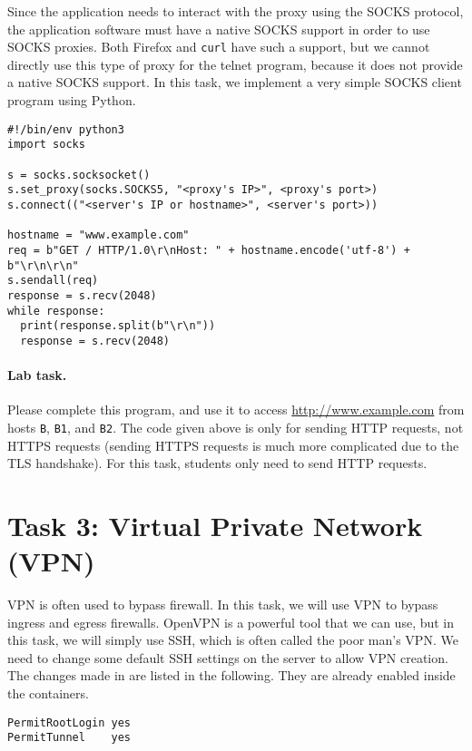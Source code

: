 Since the application needs to interact with the proxy using the
SOCKS protocol, the application software must have a native SOCKS support in order to use
SOCKS proxies. Both Firefox and \texttt{curl} have such a support, but
we cannot directly use this type of proxy for the telnet program,
because it does not provide a native SOCKS support. 
In this task, we implement a very simple SOCKS client program
using Python. 

\begin{lstlisting}
#!/bin/env python3
import socks

s = socks.socksocket()
s.set_proxy(socks.SOCKS5, "<proxy's IP>", <proxy's port>) 
s.connect(("<server's IP or hostname>", <server's port>))                

hostname = "www.example.com"
req = b"GET / HTTP/1.0\r\nHost: " + hostname.encode('utf-8') + b"\r\n\r\n"
s.sendall(req)
response = s.recv(2048)
while response:
  print(response.split(b"\r\n"))
  response = s.recv(2048)
\end{lstlisting}

\paragraph{Lab task.}
Please complete this program, and use it to access \url{http://www.example.com} 
from hosts \texttt{B}, \texttt{B1}, and \texttt{B2}.  
The code given above is only for sending HTTP requests, not HTTPS requests (sending
HTTPS requests is much more complicated due to the TLS handshake). 
For this task, students only need to send HTTP requests.


\section{Task 3: Virtual Private Network (VPN)} 

VPN is often used to bypass firewall. In this task, we will use VPN 
to bypass ingress and egress firewalls.  
OpenVPN is a powerful tool that we can use, but in this task,
we will simply use SSH, which is often called the poor man's VPN. 
We need to change some default SSH settings on the
server to allow VPN creation. The changes made in
 are listed in the following.
They are already enabled inside the containers.

\begin{lstlisting}
PermitRootLogin yes
PermitTunnel    yes
\end{lstlisting}


